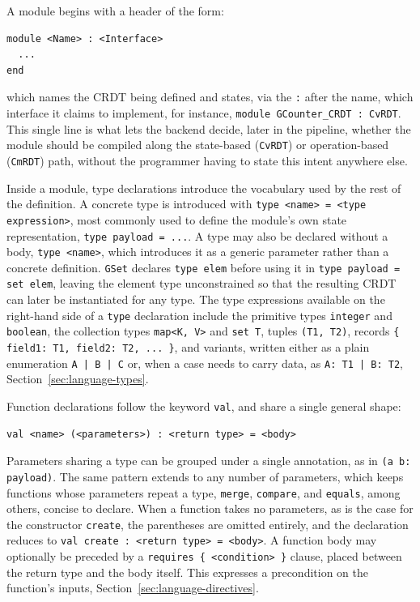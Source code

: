 A module begins with a header of the form:

\begin{verbatim}
module <Name> : <Interface>
  ...
end
\end{verbatim}

which names the CRDT being defined and states, via the \texttt{:} after the name, which interface it claims to implement,
for instance, \texttt{module GCounter\_CRDT : CvRDT}. This single line is what lets the backend decide, later in the
pipeline, whether the module should be compiled along the state-based (\texttt{CvRDT}) or operation-based (\texttt{CmRDT})
path, without the programmer having to state this intent anywhere else.

Inside a module, type declarations introduce the vocabulary used by the rest of the definition. A concrete type is
introduced with \texttt{type <name> = <type expression>}, most commonly used to define the module's own state
representation, \texttt{type payload = ...}. A type may also be declared without a body, \texttt{type <name>},
which introduces it as a generic parameter rather than a concrete definition. \texttt{GSet} declares \texttt{type elem}
before using it in \texttt{type payload = set elem}, leaving the element type unconstrained so that the resulting CRDT
can later be instantiated for any type. The type expressions available on the right-hand side of a \texttt{type}
declaration include the primitive types \texttt{integer} and \texttt{boolean}, the collection types \texttt{map<K, V>}
and \texttt{set T}, tuples \texttt{(T1, T2)}, records \texttt{\{ field1: T1, field2: T2, ... \}}, and variants, written
either as a plain enumeration \texttt{A | B | C} or, when a case needs to carry data, as \texttt{A: T1 | B: T2},
Section~\ref{sec:language-types}.

Function declarations follow the keyword \texttt{val}, and share a single general shape:

\begin{verbatim}
val <name> (<parameters>) : <return type> = <body>
\end{verbatim}

Parameters sharing a type can be grouped under a single annotation, as in \texttt{(a b: payload)}.
The same pattern extends to any number of parameters, which keeps functions whose parameters repeat a type,
\texttt{merge}, \texttt{compare}, and \texttt{equals}, among others, concise to declare. When a function takes no
parameters, as is the case for the constructor \texttt{create}, the parentheses are omitted entirely, and the declaration
reduces to \texttt{val create : <return type> = <body>}. A function body may optionally be preceded by a
\texttt{requires \{ <condition> \}} clause, placed between the return type and the body itself. This expresses a
precondition on the function's inputs, Section~\ref{sec:language-directives}.

